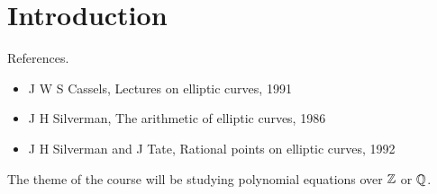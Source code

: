 \def\module{M4P32 Number Theory: Elliptic Curves}
\def\lecturer{Prof Toby Gee}
\def\term{Autumn 2018}
\def\cover{
$$
\begin{tikzpicture}[scale=2]
\draw [domain=-2:0] plot (\x, {sqrt(\x*(\x - 1)*(\x + 2))});
\draw [domain=-2:0] plot (\x, {-sqrt(\x*(\x - 1)*(\x + 2))});
\draw [domain=1:2] plot (\x, {sqrt(\x*(\x - 1)*(\x + 2))});
\draw [domain=1:2] plot (\x, {-sqrt(\x*(\x - 1)*(\x + 2))});
\fill (0, 0) circle (0.05) node[below left]{$ \OO $};
\fill (-0.25, 0.7) circle (0.05) node[above]{$ P $};
\fill (-2, 0) circle (0.05) node[below left]{$ Q $};
\draw [dashed, domain=-3:3] plot (\x, {0.4*(\x + 2)});
\fill (1.4, 1.35) circle (0.05) node[below right]{$ -\br{P + Q} $};
\draw [dashed, domain=-3:3] plot (\x, \x);
\fill (-1.4, -1.4) circle (0.05) node[below right]{$ P + Q $};
\fill (-0.4, -0.95) circle (0.05) node[below]{$ R $};
\draw [dashed, domain=-3:3] plot (\x, {-0.6*(\x + 2)});
\fill (1.75, -2.25) circle (0.05) node[above right]{$ -\br{Q + R} $};
\draw [dashed, domain=-2.5:2.5] plot (\x, {-1.3*\x});
\fill (-1.1, 1.45) circle (0.05) node[above right]{$ Q + R $};
\draw [dashed, domain=-3:3] plot (\x, {-0.8*\x + 0.55});
\draw [dashed, domain=-3:3] plot (\x, {0.45*\x - 0.75});
\fill (1.05, -0.3) circle (0.05) node[right]{$ S $};
\draw [dashed, domain=-3:3] plot (\x, {-0.3*\x});
\fill (-1.95, 0.55) circle (0.05) node[below left]{$ T $};
\draw (0, -2.5) node {$ T = -S = P + \br{Q + R} = \br{P + Q} + R $};
\end{tikzpicture}
$$
}
\def\syllabus{The $ p $-adic numbers. Basic algebraic geometry. Plane conics. The Hasse principle. Cubics. Elliptic curves over $ \Q_p $. Elliptic curves over $ \Q $. The Mordell-Weil theorem.}
\def\thm{section}







\section{Introduction}


References.
\begin{itemize}
\item J W S Cassels, Lectures on elliptic curves, 1991
\item J H Silverman, The arithmetic of elliptic curves, 1986
\item J H Silverman and J Tate, Rational points on elliptic curves, 1992
\end{itemize}
The theme of the course will be studying polynomial equations over $ \mathbb{Z} $ or $ \mathbb{Q} $.


